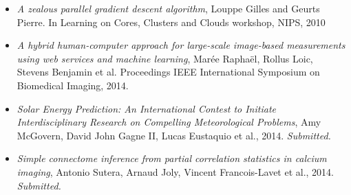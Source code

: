 \begin{itemize}

\item \citep{louppe:2010} \textit{A zealous parallel gradient descent algorithm},
Louppe Gilles and Geurts Pierre.
In Learning on Cores, Clusters and Clouds workshop, NIPS, 2010

\item \citep{maree:2014} \textit{A hybrid human-computer approach for large-scale image-based measurements using web services and machine learning},
Mar{\'e}e Rapha{\"e}l, Rollus Loic, Stevens Benjamin et al.
Proceedings IEEE International Symposium on Biomedical Imaging, 2014.

\item \citep{amy:2014} \textit{Solar Energy Prediction: An International Contest to Initiate Interdisciplinary Research on Compelling Meteorological Problems},
Amy McGovern, David John Gagne II, Lucas Eustaquio et al., 2014. \textit{Submitted.}

\item \citep{sutera:2014} \textit{Simple connectome inference from partial correlation statistics in calcium imaging},
Antonio Sutera, Arnaud Joly, Vincent Francois-Lavet et al., 2014. \textit{Submitted.}

\end{itemize}
